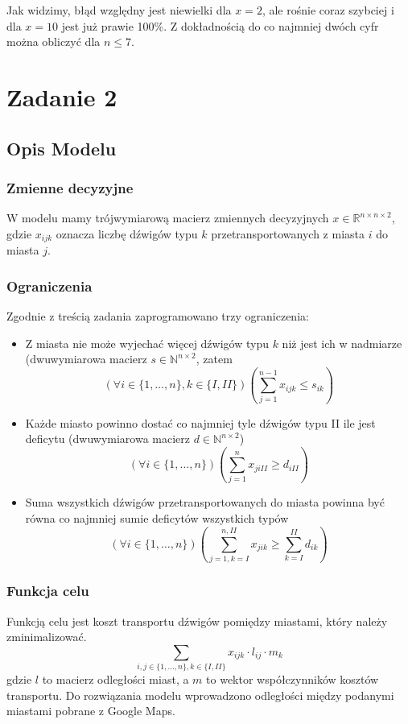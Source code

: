 \documentclass{article}
\begin{document}
Jak widzimy, błąd względny jest niewielki dla $x=2$, ale rośnie coraz szybciej i dla $x=10$ jest już prawie 100\%. Z dokładnością do co najmniej dwóch cyfr można obliczyć dla $n \leq 7$.

\section{Zadanie 2}
\subsection{Opis Modelu}
\subsubsection{Zmienne decyzyjne}
W modelu mamy trójwymiarową macierz zmiennych decyzyjnych $x \in \mathbb{R}^{n\times n\times 2}$, gdzie $x_{ijk}$ oznacza liczbę dźwigów typu $k$ przetransportowanych z miasta $i$ do miasta $j$.
\subsubsection{Ograniczenia}
Zgodnie z treścią zadania zaprogramowano trzy ograniczenia:
\begin{itemize}
	\item Z miasta nie może wyjechać więcej dźwigów typu $k$ niż jest ich w nadmiarze (dwuwymiarowa macierz $s \in \mathbb{N}^{n\times 2}$, zatem
	\[(\forall i \in \{1,\dots,n\}, k \in \{I,II\}) \left(\sum_{j=1}^{n-1}{x_{ijk} \leq s_{ik}}\right)\]
	\item Każde miasto powinno dostać co najmniej tyle dźwigów typu II ile jest deficytu (dwuwymiarowa macierz $d \in \mathbb{N}^{n\times 2}$)
	\[(\forall i \in \{1,\dots,n\}) \left(\sum_{j=1}^{n}{x_{jiII} \geq d_{iII}}\right)\]
	\item Suma wszystkich dźwigów przetransportowanych do miasta powinna być równa co najmniej sumie deficytów wszystkich typów
	\[(\forall i \in \{1,\dots,n\}) \left(\sum_{j=1,k=I}^{n,II}{x_{jik}} \geq \sum_{k=I}^{II}{d_{ik}}\right)\]
\end{itemize}
\subsubsection{Funkcja celu}
Funkcją celu jest koszt transportu dźwigów pomiędzy miastami, który należy zminimalizować. 
\[\sum_{i,j \in \{1,\dots,n\}, k \in \{I,II\}}{x_{ijk} \cdot l_{ij} \cdot m_k}\]
gdzie $l$ to macierz odległości miast, a $m$ to wektor współczynników kosztów transportu.
Do rozwiązania modelu wprowadzono odległości między podanymi miastami pobrane z Google Maps.
\end{document}
